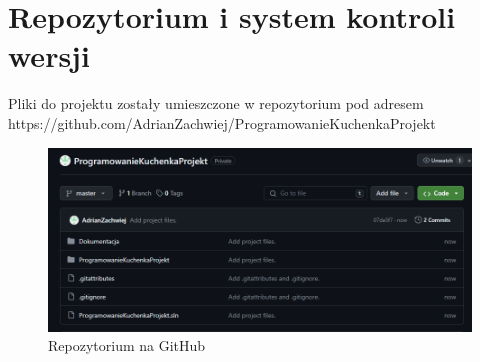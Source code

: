 \chapter{Repozytorium i system kontroli wersji}

Pliki do projektu zostały umieszczone w repozytorium pod adresem https://github.com/AdrianZachwiej/ProgramowanieKuchenkaProjekt

\begin{figure}[h]
    \centering
    \includegraphics[width=\textwidth]{git.png}
      \caption{Repozytorium na GitHub}
    \label{fig:example}
\end{figure}
